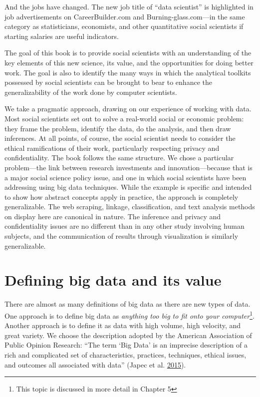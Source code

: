 \documentclass[]{krantz}
\begin{document}
And the jobs have changed. The new job title of ``data scientist'' is
highlighted in job advertisements on CareerBuilder.com and
Burning-glass.com---in the same category as statisticians, economists,
and other quantitative social scientists if starting salaries are useful
indicators.

The goal of this book is to provide social scientists with an
understanding of the key elements of this new science, its value, and
the opportunities for doing better work. The goal is also to identify
the many ways in which the analytical toolkits possessed by social
scientists can be brought to bear to enhance the generalizability of the
work done by computer scientists.

We take a pragmatic approach, drawing on our experience of working with
data. Most social scientists set out to solve a real-world social or
economic problem: they frame the problem, identify the data, do the
analysis, and then draw inferences. At all points, of course, the social
scientist needs to consider the ethical ramifications of their work,
particularly respecting privacy and confidentiality. The book follows
the same structure. We chose a particular problem---the link between
research investments and innovation---because that is a major social
science policy issue, and one in which social scientists have been
addressing using big data techniques. While the example is specific and
intended to show how abstract concepts apply in practice, the approach
is completely generalizable. The web scraping, linkage, classification,
and text analysis methods on display here are canonical in nature. The
inference and privacy and confidentiality issues are no different than
in any other study involving human subjects, and the communication of
results through visualization is similarly generalizable.

\section{Defining big data and its value}\label{sec:1-2}

There are almost as many definitions of big data as there are new types
of data. One approach is to define big data as \emph{anything too big to
fit onto your computer}\footnote{This topic is discussed in more detail
  in Chapter 5}. Another approach is to define it as data with high
volume, high velocity, and great variety. We choose the description
adopted by the American Association of Public Opinion Research: ``The
term `Big Data' is an imprecise description of a rich and complicated
set of characteristics, practices, techniques, ethical issues, and
outcomes all associated with data'' (Japec et al.
\protect\hyperlink{ref-japec2015big}{2015}).
\end{document}

